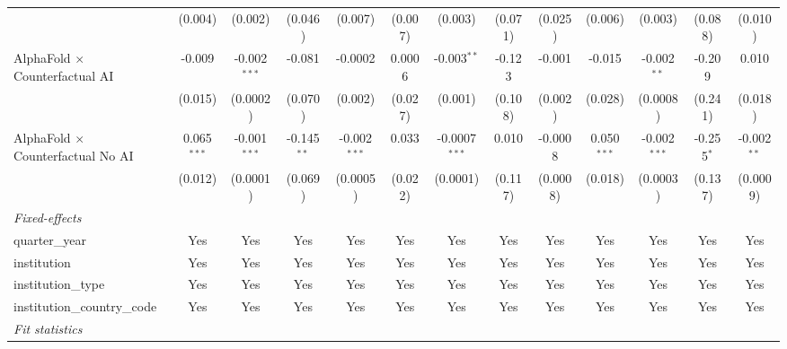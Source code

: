 \begin{tabular}{lcccccccccccc}
                                            & (0.004)       & (0.002)        & (0.046)       & (0.007)        & (0.007)       & (0.003)         & (0.071)      & (0.025)     & (0.006)       & (0.003)        & (0.088)       & (0.010)\\   
   AlphaFold $\times$ Counterfactual AI     & -0.009        & -0.002$^{***}$ & -0.081        & -0.0002        & 0.0006        & -0.003$^{**}$   & -0.123       & -0.001      & -0.015        & -0.002$^{**}$  & -0.209        & 0.010\\   
                                            & (0.015)       & (0.0002)       & (0.070)       & (0.002)        & (0.027)       & (0.001)         & (0.108)      & (0.002)     & (0.028)       & (0.0008)       & (0.241)       & (0.018)\\   
   AlphaFold $\times$ Counterfactual No AI  & 0.065$^{***}$ & -0.001$^{***}$ & -0.145$^{**}$ & -0.002$^{***}$ & 0.033         & -0.0007$^{***}$ & 0.010        & -0.0008     & 0.050$^{***}$ & -0.002$^{***}$ & -0.255$^{*}$  & -0.002$^{**}$\\   
                                            & (0.012)       & (0.0001)       & (0.069)       & (0.0005)       & (0.022)       & (0.0001)        & (0.117)      & (0.0008)    & (0.018)       & (0.0003)       & (0.137)       & (0.0009)\\   
   \midrule
   \emph{Fixed-effects}\\
   quarter\_year                            & Yes           & Yes            & Yes           & Yes            & Yes           & Yes             & Yes          & Yes         & Yes           & Yes            & Yes           & Yes\\  
   institution                              & Yes           & Yes            & Yes           & Yes            & Yes           & Yes             & Yes          & Yes         & Yes           & Yes            & Yes           & Yes\\  
   institution\_type                        & Yes           & Yes            & Yes           & Yes            & Yes           & Yes             & Yes          & Yes         & Yes           & Yes            & Yes           & Yes\\  
   institution\_country\_code               & Yes           & Yes            & Yes           & Yes            & Yes           & Yes             & Yes          & Yes         & Yes           & Yes            & Yes           & Yes\\  
   \midrule
   \emph{Fit statistics}\\

\end{tabular}
